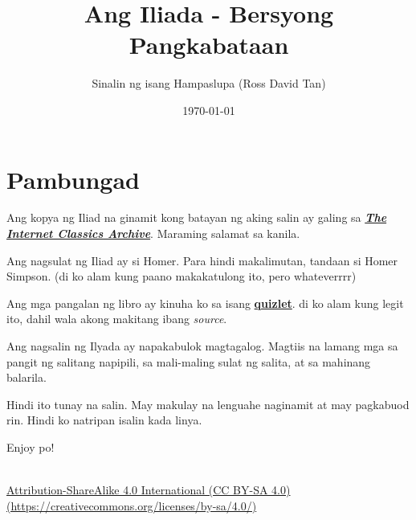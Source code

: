 \documentclass[12pt,letterpaper]{report}
\begin{document}
\title{\textbf{Ang Iliada - Bersyong Pangkabataan}}
\author{Sinalin ng isang Hampaslupa (Ross David Tan)}
\date{\today}
\maketitle

\tableofcontents
\pagebreak

\setlength{\parskip}{1em}

\chapter*{Pambungad}
\begin{center}

    Ang kopya ng Iliad na ginamit kong batayan ng aking salin ay galing sa \href{http://classics.mit.edu/Homer/iliad.html}{\textbf{\textit{The Internet Classics Archive}}}. Maraming salamat sa kanila.


    Ang nagsulat ng Iliad ay si Homer. Para hindi makalimutan, tandaan si Homer Simpson. 
    (di ko alam kung paano makakatulong ito, pero whateverrrr)

    Ang mga pangalan ng libro ay kinuha ko sa isang \href{https://quizlet.com/24340225/titles-of-each-book-in-the-iliad-flash-cards/}{\textbf{quizlet}}.
    di ko alam kung legit ito, dahil wala akong makitang ibang \textit{source}.

    Ang nagsalin ng Ilyada ay napakabulok magtagalog. Magtiis na lamang mga sa pangit ng salitang napipili,
    sa mali-maling sulat ng salita, at sa mahinang balarila.

    Hindi ito tunay na salin. May makulay na lenguahe naginamit at may pagkabuod rin.
    Hindi ko natripan isalin kada linya.

    Enjoy po!
    \vspace*{\fill}
\end{center}
\pagebreak

\vspace*{\fill}
\begin{center}
    \href{https://creativecommons.org/licenses/by-sa/4.0/}{\ccbysa \\[0.5cm] Attribution-ShareAlike 4.0 International (CC BY-SA 4.0) \\ (https://creativecommons.org/licenses/by-sa/4.0/)}
    
\end{center}
\vspace*{\fill}
\end{document}
